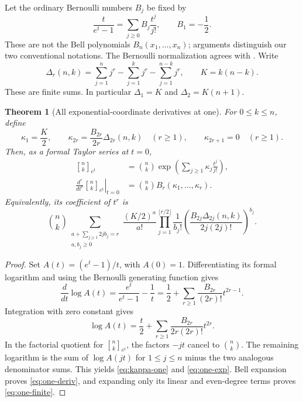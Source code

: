 \documentclass[11pt,a4paper]{article}
\numberwithin{equation}{section}
\newtheorem{theorem}{Theorem}[section]
\theoremstyle{definition}
\theoremstyle{remark}
\newcommand{\qbb}[3]{\genfrac{[}{]}{0pt}{}{#1}{#2}_{#3}}
\begin{document}
Let the ordinary Bernoulli numbers $B_j$ be fixed by
\[
 \frac{t}{e^t-1}=\sum_{j\ge0}B_j\frac{t^j}{j!},\qquad B_1=-\frac12.
\]
These are not the Bell polynomials $B_n(x_1,\ldots,x_n)$; arguments distinguish
our two conventional notations. The Bernoulli normalization agrees with
\cite{DLMF24}. Write
\begin{equation}\label{eq:Delta}
 \Delta_r(n,k)=\sum_{j=1}^n j^r-\sum_{j=1}^k j^r
                  -\sum_{j=1}^{n-k}j^r,\qquad K=k(n-k).
\end{equation}
These are finite sums. In particular $\Delta_1=K$ and
$\Delta_2=K(n+1)$.

\begin{theorem}[All exponential-coordinate derivatives at one]\label{thm:one}
For $0\le k\le n$, define
\begin{equation}\label{eq:kappa-one}
 \kappa_1=\frac K2,\qquad
 \kappa_{2r}=\frac{B_{2r}}{2r}\Delta_{2r}(n,k)\quad(r\ge1),\qquad
 \kappa_{2r+1}=0\quad(r\ge1).
\end{equation}
Then, as a formal Taylor series at $t=0$,
\begin{align}
 \qbb nk{e^t}
 &=\binom nk\exp\left(\sum_{j\ge1}\kappa_j\frac{t^j}{j!}\right),
 \label{eq:one-exp}\\
 \left.\frac{d^r}{dt^r}\qbb nk{e^t}\right|_{t=0}
 &=\binom nk B_r(\kappa_1,\ldots,\kappa_r).
 \label{eq:one-deriv}
\end{align}
Equivalently, its coefficient of $t^r$ is
\begin{equation}\label{eq:one-finite}
 \binom nk
 \sum_{\substack{a+\sum_{j\ge1}2j b_j=r\\a,b_j\ge0}}
 \frac{(K/2)^a}{a!}
 \prod_{j=1}^{\lfloor r/2\rfloor}
       \frac1{b_j!}
       \left(\frac{B_{2j}\Delta_{2j}(n,k)}{2j(2j)!}\right)^{b_j}.
\end{equation}
\end{theorem}
\begin{proof}
Set $A(t)=(e^t-1)/t$, with $A(0)=1$. Differentiating its formal logarithm and
using the Bernoulli generating function gives
\[
 \frac{d}{dt}\log A(t)
  =\frac{e^t}{e^t-1}-\frac1t
  =\frac12+\sum_{r\ge1}\frac{B_{2r}}{(2r)!}t^{2r-1}.
\]
Integration with zero constant gives
\[
 \log A(t)=\frac t2+\sum_{r\ge1}
                 \frac{B_{2r}}{2r(2r)!}t^{2r}.
\]
In the factorial quotient for $\qbb nk{e^t}$, the factors $-jt$ cancel to
$\binom nk$. The remaining logarithm is the sum of $\log A(jt)$ for $1\le j\le n$
minus the two analogous denominator sums. This yields \eqref{eq:kappa-one} and
\eqref{eq:one-exp}. Bell expansion proves \eqref{eq:one-deriv}, and expanding
only its linear and even-degree terms proves \eqref{eq:one-finite}.
\end{proof}
\end{document}
